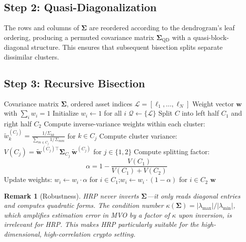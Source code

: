 \documentclass[12pt,a4paper]{article}
\newtheorem{remark}{Remark}[section]
\begin{document}
\subsection{Step 2: Quasi-Diagonalization}

The rows and columns of $\bm{\Sigma}$ are reordered according to the dendrogram's leaf ordering, producing a permuted covariance matrix $\bm{\Sigma}_{\text{QD}}$ with a quasi-block-diagonal structure. This ensures that subsequent bisection splits separate dissimilar clusters.

\subsection{Step 3: Recursive Bisection}

\begin{algorithm}[H]
\caption{HRP Recursive Bisection}
\label{alg:hrp}
\begin{algorithmic}[1]
\Require Covariance matrix $\bm{\Sigma}$, ordered asset indices $\mathcal{L} = [\ell_1, \ldots, \ell_N]$
\Ensure Weight vector $\bm{w}$ with $\sum_i w_i = 1$
\State Initialize $w_i \gets 1$ for all $i$
\State $\mathcal{Q} \gets \{\mathcal{L}\}$ 
    \State Split $C$ into left half $C_1$ and right half $C_2$
    \State Compute inverse-variance weights within each cluster:
    \Statex \qquad $\tilde{w}_k^{(C_j)} = \frac{1/\Sigma_{kk}}{\sum_{m \in C_j} 1/\Sigma_{mm}}$ for $k \in C_j$
    \State Compute cluster variance:
    \Statex \qquad $V(C_j) = \tilde{\bm{w}}^{(C_j)\top} \bm{\Sigma}_{C_j}\, \tilde{\bm{w}}^{(C_j)}$ for $j \in \{1, 2\}$
    \State Compute splitting factor:
    \begin{equation}
        \alpha = 1 - \frac{V(C_1)}{V(C_1) + V(C_2)}
        \label{eq:hrp-alpha}
    \end{equation}
    \State Update weights: $w_i \gets w_i \cdot \alpha$ for $i \in C_1$;\quad $w_i \gets w_i \cdot (1 - \alpha)$ for $i \in C_2$
\EndWhile
\State \Return $\bm{w}$
\end{algorithmic}
\end{algorithm}

\begin{remark}[Robustness]
HRP never inverts $\bm{\Sigma}$---it only reads diagonal entries and computes quadratic forms. The condition number $\kappa(\bm{\Sigma}) = |\lambda_{\max}|/|\lambda_{\min}|$, which amplifies estimation error in MVO by a factor of $\kappa$ upon inversion, is irrelevant for HRP. This makes HRP particularly suitable for the high-dimensional, high-correlation crypto setting.
\end{remark}
\end{document}
